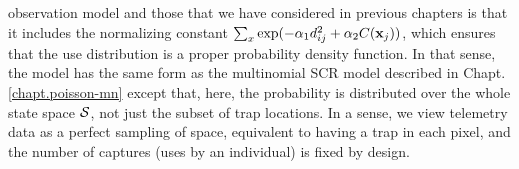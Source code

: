 observation model and those that we have considered in previous
chapters is that it includes the normalizing constant $\sum_{x}
\exp(-\alpha_{1} d_{ij}^{2} +\alpha_{2} C({\bf x}_{j}))$, which
ensures that the use distribution is a proper probability density
function. In that sense, the model has the same form as the
multinomial SCR model described in Chapt. \ref{chapt.poisson-mn}
except that, here, the probability is distributed 
over the whole state
space ${\cal S}$, not just the subset of trap locations. In a sense,
we view telemetry data as a perfect sampling of space, equivalent to
having a trap in each pixel, and the number of captures (uses by an
individual) is fixed by design.


